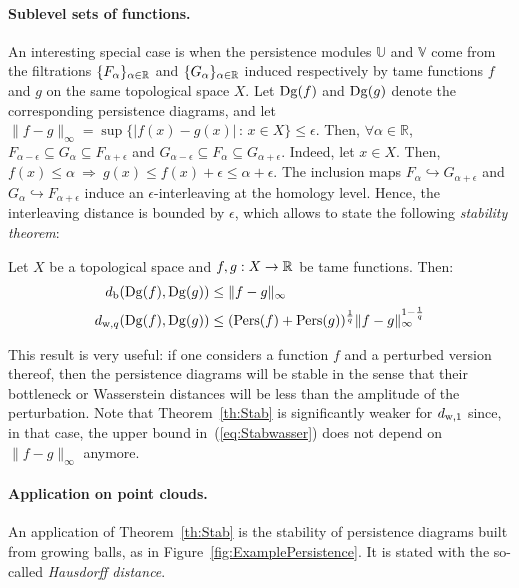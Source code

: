 
\paragraph*{Sublevel sets of functions.} An interesting special case is when the persistence modules $\mathbb{U}$ and $\mathbb{V}$ come 
from the filtrations $\{F_{\alpha}\}_{\alpha\in\mathbb{R}}$ and $\{G_{\alpha}\}_{\alpha\in\mathbb{R}}$ induced respectively by tame functions $f$ and $g$ 
on the same topological space $X$. Let $\mathrm{Dg}(f)$ and $\mathrm{Dg}(g)$ denote the corresponding persistence diagrams, and 
let $\|f-g\|_{\infty}=\sup\{|f(x)-g(x)|\,:\,x\in X\} \leq\epsilon$. 
Then, $\forall\alpha\in\mathbb{R}$, $F_{\alpha-\epsilon}\subseteq G_{\alpha}\subseteq F_{\alpha+\epsilon}$ and 
$G_{\alpha-\epsilon}\subseteq F_{\alpha}\subseteq G_{\alpha+\epsilon}$. Indeed, let $x\in X$. 
Then, $f(x)\leq\alpha\ \Rightarrow\ g(x)\leq f(x)+\epsilon\leq\alpha+\epsilon$. The 
inclusion maps $F_{\alpha}\hookrightarrow G_{\alpha+\epsilon}$ and $G_{\alpha}\hookrightarrow F_{\alpha+\epsilon}$ 
induce an $\epsilon$-interleaving at the homology level. Hence, the interleaving distance is bounded by $\epsilon$,
which allows to state the following {\em stability theorem}:

\begin{thm}\label{th:Stab}
Let $X$ be a topological space and $f,g:X\rightarrow\mathbb{R}$ be tame functions.
Then: 
\begin{align}
d_{\rm b}(\mathrm{Dg}(f),\mathrm{Dg}(g)) & \leq \|f-g\|_{\infty} \label{eq:Stabbottle} \\
d_{{\rm w},q}(\mathrm{Dg}(f),\mathrm{Dg}(g)) & \leq ({\rm Pers}(f)+{\rm Pers}(g))^{\frac 1q}\|f-g\|_{\infty}^{1-\frac 1q} \label{eq:Stabwasser}
\end{align}
\end{thm}

This result is very useful: if one considers a function $f$ and a perturbed version thereof, 
then the persistence diagrams will be stable in the sense that their bottleneck or Wasserstein distances will be less 
than the amplitude of the perturbation. Note that Theorem~\ref{th:Stab} is significantly  
weaker for $d_{{\rm w},1}$ since, in that case, the upper bound in~(\ref{eq:Stabwasser}) does not depend on $\|f-g\|_\infty$ anymore. 

\paragraph*{Application on point clouds.} An application of Theorem~\ref{th:Stab} is the stability of persistence diagrams
built from growing balls, as in Figure~\ref{fig:ExamplePersistence}. It is stated with the so-called {\em Hausdorff distance}.

